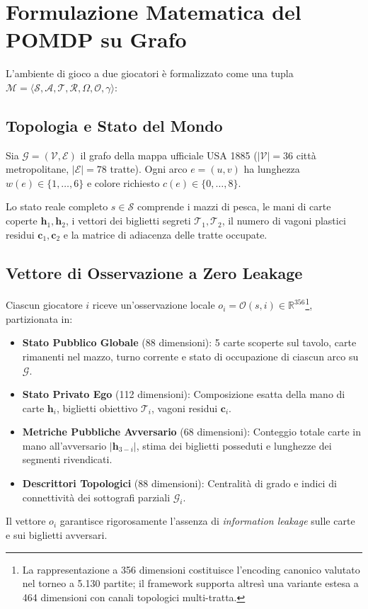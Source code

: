 \documentclass[11pt,a4paper]{article}
\begin{document}
\section{Formulazione Matematica del POMDP su Grafo}
\label{sec:formulazione}
L'ambiente di gioco a due giocatori è formalizzato come una tupla $\mathcal{M} = \langle \mathcal{S}, \mathcal{A}, \mathcal{T}, \mathcal{R}, \Omega, \mathcal{O}, \gamma \rangle$:

\subsection{Topologia e Stato del Mondo}
Sia $\mathcal{G} = (\mathcal{V}, \mathcal{E})$ il grafo della mappa ufficiale USA 1885 ($|\mathcal{V}| = 36$ città metropolitane, $|\mathcal{E}| = 78$ tratte). Ogni arco $e = (u, v)$ ha lunghezza $w(e) \in \{1,\dots,6\}$ e colore richiesto $c(e) \in \{0,\dots,8\}$.

Lo stato reale completo $s \in \mathcal{S}$ comprende i mazzi di pesca, le mani di carte coperte $\mathbf{h}_1, \mathbf{h}_2$, i vettori dei biglietti segreti $\mathcal{T}_1, \mathcal{T}_2$, il numero di vagoni plastici residui $\mathbf{c}_1, \mathbf{c}_2$ e la matrice di adiacenza delle tratte occupate.

\subsection{Vettore di Osservazione a Zero Leakage}
Ciascun giocatore $i$ riceve un'osservazione locale $o_i = \mathcal{O}(s, i) \in \mathbb{R}^{356}$\footnote{La rappresentazione a 356 dimensioni costituisce l'encoding canonico valutato nel torneo a 5.130 partite; il framework supporta altresì una variante estesa a 464 dimensioni con canali topologici multi-tratta.}, partizionata in:
\begin{itemize}
    \item \textbf{Stato Pubblico Globale} (88 dimensioni): 5 carte scoperte sul tavolo, carte rimanenti nel mazzo, turno corrente e stato di occupazione di ciascun arco su $\mathcal{G}$.
    \item \textbf{Stato Privato Ego} (112 dimensioni): Composizione esatta della mano di carte $\mathbf{h}_i$, biglietti obiettivo $\mathcal{T}_i$, vagoni residui $\mathbf{c}_i$.
    \item \textbf{Metriche Pubbliche Avversario} (68 dimensioni): Conteggio totale carte in mano all'avversario $|\mathbf{h}_{3-i}|$, stima dei biglietti posseduti e lunghezze dei segmenti rivendicati.
    \item \textbf{Descrittori Topologici} (88 dimensioni): Centralità di grado e indici di connettività dei sottografi parziali $\mathcal{G}_i$.
\end{itemize}
Il vettore $o_i$ garantisce rigorosamente l'assenza di \textit{information leakage} sulle carte e sui biglietti avversari.
\end{document}
